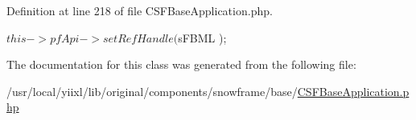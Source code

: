 Definition at line 218 of file CSFBaseApplication.php.




\begin{DoxyCode}
    {
        $this->pfApi->setRefHandle( $sFBML );
    }
\end{DoxyCode}




The documentation for this class was generated from the following file:\begin{DoxyCompactItemize}
\item 
/usr/local/yiixl/lib/original/components/snowframe/base/\hyperlink{CSFBaseApplication_8php}{CSFBaseApplication.php}\end{DoxyCompactItemize}

